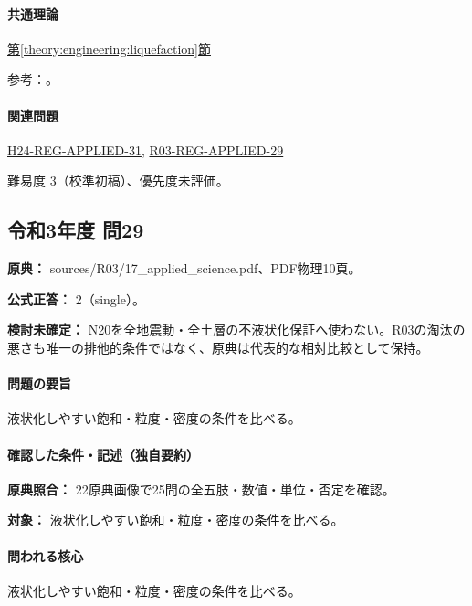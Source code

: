 \paragraph{共通理論} \hyperref[theory:engineering:liquefaction]{第\ref*{theory:engineering:liquefaction}節}

\par 参考：\cite{eng52_liquefaction,eng52_liq_sorting}。

\paragraph{関連問題} \hyperref[q:h24-reg-applied-31]{H24-REG-APPLIED-31}, \hyperref[q:r03-reg-applied-29]{R03-REG-APPLIED-29}

\par 難易度 3（校準初稿）、優先度未評価。

\subsection{令和3年度 問29}
\label{q:r03-reg-applied-29}

\noindent\textbf{原典：} sources/R03/17\_applied\_science.pdf、PDF物理10頁。

\textbf{公式正答：} 2（single）。

\par\textbf{検討未確定：} N20を全地震動・全土層の不液状化保証へ使わない。R03の淘汰の悪さも唯一の排他的条件ではなく、原典は代表的な相対比較として保持。

\paragraph{問題の要旨} 液状化しやすい飽和・粒度・密度の条件を比べる。

\paragraph{確認した条件・記述（独自要約）}\mbox{}\par

\noindent\textbf{原典照合：} 22原典画像で25問の全五肢・数値・単位・否定を確認。\par

\noindent\textbf{対象：} 液状化しやすい飽和・粒度・密度の条件を比べる。\par

\paragraph{問われる核心} 液状化しやすい飽和・粒度・密度の条件を比べる。

